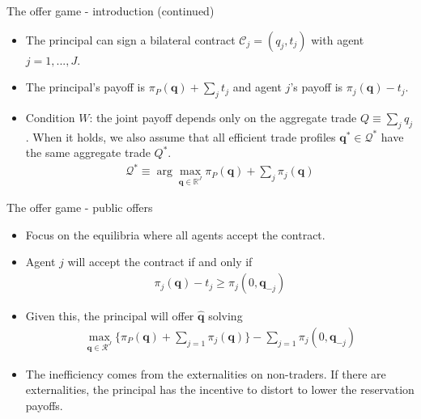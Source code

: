 \documentclass[aspectratio=169]{beamer}  %
\begin{document}
\begin{frame}{The offer game - introduction (continued)}
    \begin{itemize}
        \item The principal can sign a bilateral contract $\mathcal{C}_j=(q_j,t_j)$ with agent $j=1,...,J$. \vspace{.2cm}
        \item The principal's payoff is $\pi_P(\mathbf{q})+\sum_{j}t_j$ and agent $j$'s payoff is $\pi_j(\mathbf{q})-t_j$. \vspace{.2cm}
        \item Condition $W$: the joint payoff depends only on the aggregate trade $Q\equiv\sum_jq_j$. When it holds, we also assume that all efficient trade profiles $\mathbf{q}^*\in\mathcal{Q}^*$ have the same aggregate trade $Q^*$. \vspace{.2cm}
        \begin{align*}
            \mathcal{Q}^* \equiv \arg \max_{\mathbf{q} \in \mathbb{R}^J} \pi_P(\mathbf{q}) + \sum_j \pi_j(\mathbf{q})
        \end{align*}
    \end{itemize}
\end{frame}



\begin{frame}{The offer game - public offers}
    \begin{itemize}
        \item Focus on the equilibria where all agents accept the contract. \vspace{.2cm}
        \item Agent $j$ will accept the contract if and only if
        \begin{align*}
            \pi_j(\mathbf{q}) - t_j \geq \pi_j(0, \mathbf{q}_{-j})
        \end{align*}
        \item Given this, the principal will offer $\hat{\mathbf{q}}$ solving
        \begin{align}
            \max_{\mathbf{q} \in \mathcal{R}^J} \{\pi_P(\mathbf{q}) + \sum_{j=1} \pi_j(\mathbf{q})\}  - \sum_{j=1} \pi_j(0, \mathbf{q}_{-j})
        \end{align}
        \item The inefficiency comes from the externalities on non-traders. If there are externalities, the principal has the incentive to distort to lower the reservation payoffs. \vspace{.2cm}
    \end{itemize}
\end{frame}
\end{document}
